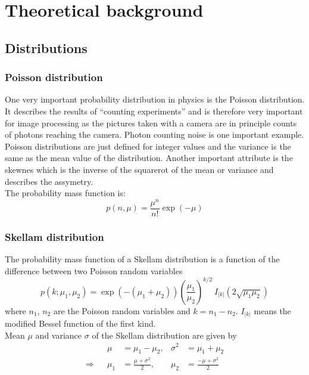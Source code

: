 \chapter{Theoretical background}

\section{Distributions}
\subsection{Poisson distribution}
One very important probability distribution in physics is the Poisson
distribution. It describes the results of ``counting experiments'' and is
therefore very important for image processing as the pictures taken with a
camera are in principle counts of photons reaching the camera. Photon counting
noise is one important example.\\
Poisson distributions are just defined for integer values and the variance is
the same as the mean value of the distribution. Another important attribute is
the skewnes which is the inverse of the squarerot of the mean or variance and describes the assymetry.\\ 
The probability mass function is:
\begin{equation}
	p(n,\mu) = \frac{\mu^n}{n!}\exp(-\mu)
\end{equation}
\subsection{Skellam distribution}
The probability
mass function of a Skellam distribution is a function of the difference between
two Poisson random variables
\begin{equation}
	p(k;\mu_1, \mu_2) =
	\exp(-(\mu_1+\mu_2))\left(\frac{\mu_1}{\mu_2}\right)^{k/2}~I_{|k|}\left(2\sqrt{\mu_1
	\mu_2}\right)
\end{equation}  
where $n_1$, $n_2$ are the Poisson random variables and $k = n_1 - n_2$.
$I_{|k|}$ means the modified Bessel function of the first kind.\\
Mean $\mu$ and variance $\sigma$ of the Skellam distribution are given by
\begin{align}
	&&\mu &= \mu_1 - \mu_2,& \sigma^2 &= \mu_1 + \mu_2\\
	\Rightarrow &&\mu_1& = \frac{\mu + \sigma^2}{2},& \mu_2 &=\frac{-\mu +
	\sigma^2}{2}
\end{align} 


